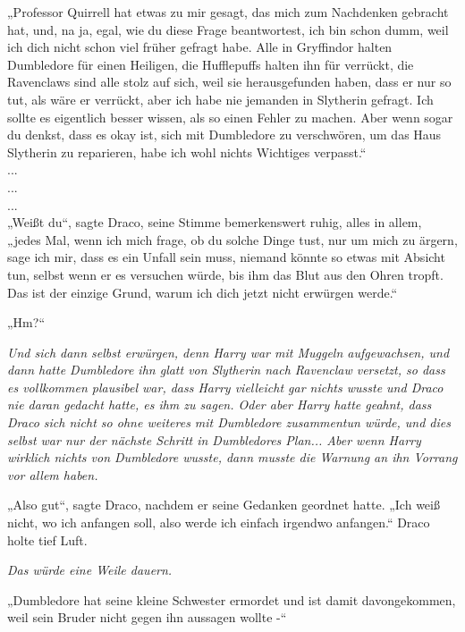 {„Professor Quirrell hat etwas zu mir gesagt, das mich zum Nachdenken gebracht hat, und, na ja, egal, wie du diese Frage beantwortest, ich bin schon dumm, weil ich dich nicht schon viel früher gefragt habe. Alle in Gryffindor halten Dumbledore für einen Heiligen, die Hufflepuffs halten ihn für verrückt, die Ravenclaws sind alle stolz auf sich, weil sie herausgefunden haben, dass er nur so tut, als wäre er verrückt, aber ich habe nie jemanden in Slytherin gefragt. Ich sollte es eigentlich besser wissen, als so einen Fehler zu machen. Aber wenn sogar du denkst, dass es okay ist, sich mit Dumbledore zu verschwören, um das Haus Slytherin zu reparieren, habe ich wohl nichts Wichtiges verpasst.“\\ ...\\ ...\\ ...\\ „Weißt du“, sagte Draco, seine Stimme bemerkenswert ruhig, alles in allem, „jedes Mal, wenn ich mich frage, ob du solche Dinge tust, nur um mich zu ärgern, sage ich mir, dass es ein Unfall sein muss, niemand könnte so etwas mit Absicht tun, selbst wenn er es versuchen würde, bis ihm das Blut aus den Ohren tropft. Das ist der einzige Grund, warum ich dich jetzt nicht erwürgen werde.“

„Hm?“

\emph{Und sich dann selbst erwürgen, denn Harry war mit Muggeln aufgewachsen, und dann hatte Dumbledore ihn glatt von Slytherin nach Ravenclaw versetzt, so dass es vollkommen plausibel war, dass Harry vielleicht gar nichts wusste und Draco nie daran gedacht hatte, es ihm zu sagen. Oder aber Harry hatte geahnt, dass Draco sich nicht so ohne weiteres mit Dumbledore zusammentun würde, und dies selbst war nur der nächste Schritt in Dumbledores Plan... Aber wenn Harry wirklich nichts von Dumbledore wusste, dann musste die Warnung an ihn Vorrang vor allem haben.}

„Also gut“, sagte Draco, nachdem er seine Gedanken geordnet hatte. „Ich weiß nicht, wo ich anfangen soll, also werde ich einfach irgendwo anfangen.“ Draco holte tief Luft.

\emph{Das würde eine Weile dauern.}

„Dumbledore hat seine kleine Schwester ermordet und ist damit davongekommen, weil sein Bruder nicht gegen ihn aussagen wollte -“

}
